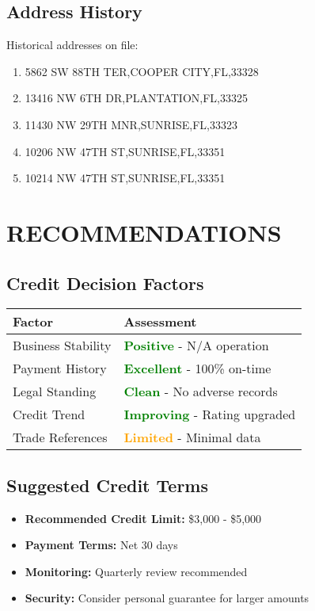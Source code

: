 \documentclass[11pt,a4paper]{article}
\begin{document}
\subsection{Address History}
Historical addresses on file:
\begin{enumerate}
    \item 5862 SW 88TH TER,COOPER CITY,FL,33328
\item 13416 NW 6TH DR,PLANTATION,FL,33325
\item 11430 NW 29TH MNR,SUNRISE,FL,33323
\item 10206 NW 47TH ST,SUNRISE,FL,33351
\item 10214 NW 47TH ST,SUNRISE,FL,33351

\end{enumerate}

\section{RECOMMENDATIONS}

\subsection{Credit Decision Factors}
\begin{tabularx}{\textwidth}{|>{\raggedright\arraybackslash}p{4cm}|>{\raggedright\arraybackslash}X|}
\hline
\rowcolor{lightgray}
\textbf{Factor} & \textbf{Assessment} \\
\hline
Business Stability & \textcolor{green}{\textbf{Positive}} - N/A operation \\
\hline
Payment History & \textcolor{green}{\textbf{Excellent}} - 100\% on-time \\
\hline
Legal Standing & \textcolor{green}{\textbf{Clean}} - No adverse records \\
\hline
Credit Trend & \textcolor{green}{\textbf{Improving}} - Rating upgraded \\
\hline
Trade References & \textcolor{orange}{\textbf{Limited}} - Minimal data \\
\hline
\end{tabularx}

\subsection{Suggested Credit Terms}
\begin{itemize}
    \item \textbf{Recommended Credit Limit:} \$3,000 - \$5,000
    \item \textbf{Payment Terms:} Net 30 days
    \item \textbf{Monitoring:} Quarterly review recommended
    \item \textbf{Security:} Consider personal guarantee for larger amounts
\end{itemize}
\end{document}
